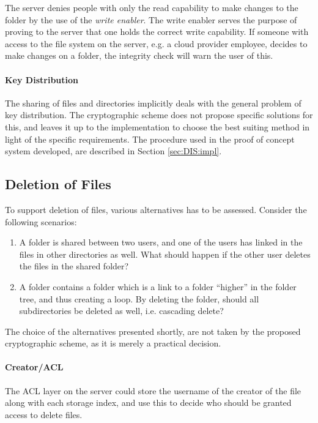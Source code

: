 \documentclass[pdftex,english,10pt,b5paper,twoside]{book}
\begin{document}
The server denies people with only the read capability to make changes to the
folder by the use of the \emph{write enabler}. The write enabler serves the
purpose of proving to the server that one holds the correct write capability.
If someone with access to the file system on the server, e.g. a cloud
provider employee, decides to make changes on a folder, the integrity check
will warn the user of this.

\paragraph{Key Distribution} The sharing of files and directories implicitly
deals with the general problem of key distribution. The cryptographic scheme
does not propose specific solutions for this, and leaves it up to the
implementation to choose the best suiting method in light of the specific
requirements. The procedure used in the proof of concept system developed, are
described in Section \ref{sec:DIS:impl}.

\subsection{Deletion of Files}

To support deletion of files, various alternatives has to be assessed.
Consider the following scenarios:

\begin{enumerate}
  \item A folder is shared between two users, and one of the users has
    linked in the files in other directories as well. What should happen if the
    other user deletes the files in the shared folder?

  \item A folder contains a folder which is a link to a folder ``higher''
    in the folder tree, and thus creating a loop. By deleting the folder,
    should all subdirectories be deleted as well, i.e. cascading delete?
\end{enumerate}

The choice of the alternatives presented shortly, are not taken by the proposed
cryptographic scheme, as it is merely a practical decision.

\paragraph{Creator/\ac{ACL}} The \ac{ACL} layer on the server could store the
username of the creator of the file along with each storage index, and use this
to decide who should be granted access to delete files.
\end{document}

